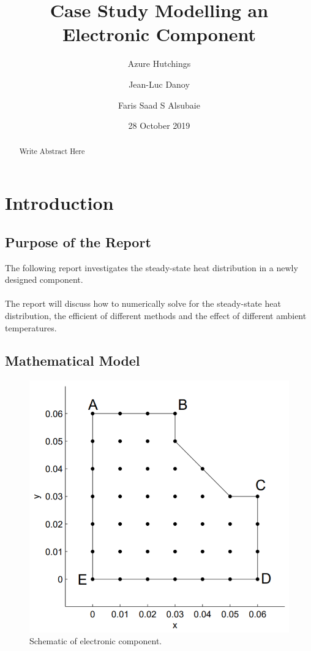 \documentclass[12pt,a4paper]{article}
\title{Case Study Modelling an Electronic Component}
\author{
  Azure Hutchings
  \and
  Jean-Luc Danoy
  \and
  Faris Saad S Alsubaie
}
\date{28 October 2019}
\begin{document}
 
\begin{titlepage}
\maketitle
\end{titlepage}

\renewcommand{\abstractname}{Executive Summary}
\begin{abstract}
Write Abstract Here
\end{abstract}

\pagebreak

\tableofcontents

\pagebreak

\section{Introduction}

\subsection{Purpose of the Report}
The following report investigates the steady-state heat distribution in a newly designed component. 
\\\\
The report will discuss how to numerically solve for the steady-state heat distribution, the efficient of different methods and the effect of different ambient temperatures.

\subsection{Mathematical Model}

\begin{figure}[H]
	\center
	\includegraphics[width=0.9\linewidth]{images/Component.png}
	\caption{Schematic of electronic component.}
	\label{fig:componentSchematic}
\end{figure}
\end{document}
